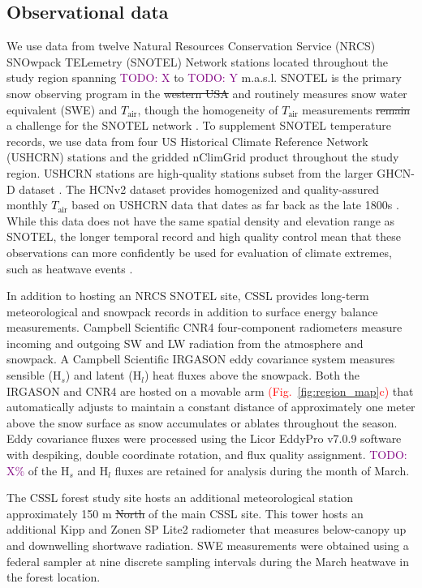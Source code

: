 \documentclass[draft]{agujournal2019}
\newcommand{\fig}[2]{\textcolor{red}{(Fig.~\ref{#1}{#2})}}   %
\newcommand{\todo}[1]{\textcolor{purple}{TODO: #1}}      %
\newcommand{\tair}{\textcolor{black}{$T_{\mathrm{air}}$}\xspace}
\providecommand{\DIFadd}[1]{{\protect\color{blue}\uwave{#1}}} %
\providecommand{\DIFdel}[1]{{\protect\color{red}\sout{#1}}}                      %
\providecommand{\DIFaddbegin}{} %
\providecommand{\DIFaddend}{} %
\providecommand{\DIFdelbegin}{} %
\providecommand{\DIFdelend}{} %
\begin{document}
\subsection{Observational data}
We use data from twelve Natural Resources Conservation Service (NRCS) SNOwpack TELemetry (SNOTEL) Network stations located throughout the study region spanning \todo{X} to \todo{Y} m.a.s.l.
SNOTEL is the primary snow observing program in the \DIFdelbegin \DIFdel{western USA }\DIFdelend \DIFaddbegin \DIFadd{WUS }\DIFaddend \cite{Serreze1999-as} and routinely measures snow water equivalent (SWE) and \tair, though the homogeneity of \tair measurements \DIFdelbegin \DIFdel{remain }\DIFdelend \DIFaddbegin \DIFadd{remains }\DIFaddend a challenge for the SNOTEL network \cite{Oyler2015-by, McAfee2019-mt}.
To supplement SNOTEL temperature records, we use data from four US Historical Climate Reference Network (USHCRN) stations and the gridded nClimGrid product throughout the study region.
USHCRN stations are high-quality stations subset from the larger GHCN-D dataset .
The HCNv2 dataset provides homogenized and quality-assured monthly \tair based on USHCRN data that dates as far back as the  late 1800s \cite{Menne2009-ushcn}.
While this data does not have the same spatial density and elevation range as SNOTEL, the longer temporal record and high quality control mean that these observations can more confidently be used for evaluation of climate extremes, such as heatwave events \cite{BercosHickey2022}.

In addition to hosting an NRCS SNOTEL site, CSSL provides long-term meteorological and snowpack records in addition to surface energy balance measurements.
Campbell Scientific CNR4 four-component radiometers measure incoming and outgoing SW and LW radiation from the atmosphere and snowpack.
A Campbell Scientific IRGASON eddy covariance system measures sensible (H$_s$) and latent (H$_l$) heat fluxes above the snowpack.
Both the IRGASON and CNR4 are hosted on a movable arm \fig{fig:region_map}{c} that automatically adjusts to maintain a constant distance of approximately one meter above the snow surface as snow accumulates or ablates throughout the season.
Eddy covariance fluxes were processed using the Licor EddyPro v7.0.9 software with despiking, double coordinate rotation, and flux quality assignment.
\todo{X\%} of the H$_s$ and H$_l$ fluxes are retained for analysis during the month of March.

The CSSL forest study site hosts an additional meteorological station approximately 150 m \DIFdelbegin \DIFdel{North }\DIFdelend \DIFaddbegin \DIFadd{north }\DIFaddend of the main CSSL site.
This tower hosts an additional Kipp and Zonen SP Lite2 radiometer that measures below-canopy up and downwelling shortwave radiation.
SWE measurements were obtained using a federal sampler \cite{Osterhuber2014-ic} at nine discrete sampling intervals during the March heatwave in the forest location.
\end{document}
